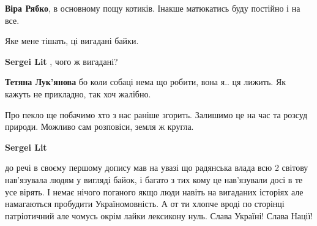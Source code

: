 \begin{itemize}
\begin{itemize}
 
\textbf{Віра Рябко}, в основному пощу котиків. Інакше матюкатись буду постійно і на все.
\end{itemize}

 
Яке мене тішать, ці вигадані байки.

\begin{itemize}
 
\textbf{Sergei Lit} , чого ж вигадані?

 
\textbf{Тетяна Лук'янова} бо коли собаці нема що робити, вона я.. ця лижить. Як кажуть не прикладно, так хоч жалібно.

 
Про пекло ще побачимо хто з нас раніше згорить. Залишимо це на час та розсуд природи. Можливо сам розповіси, земля ж кругла.

 
\textbf{Sergei Lit} 

до речі в своєму першому допису мав на увазі що радянська влада всю 2 світову
нав'язувала людям у вигляді байок, і багато з тих кому це нав'язували досі в те
усе вірять. І немає нічого поганого якщо люди навіть на вигаданих історіях але
намагаються пробудити Україномовність. А от ти хлопче вроді по сторінці
патріотичний але чомусь окрім лайки лексикону нуль. Слава Україні! Слава Нації!



\end{itemize}
\end{itemize}
